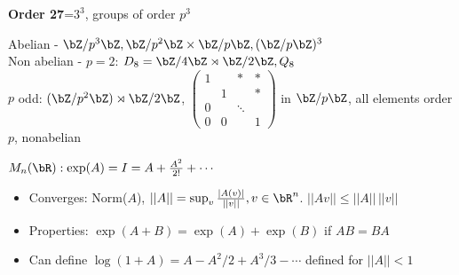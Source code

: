 \noindent
\textbf{Order 27}=$3^3$, groups of order $p^3$ 

\begin{example}
    Abelian - $\bZ/p^3\bZ, \bZ/p^2\bZ \times \bZ/p\bZ, (\bZ/p\bZ)^3$ \\
    Non abelian - $p=2$: $D_8 = \bZ/4\bZ \rtimes \bZ/2\bZ, Q_8$ \\
    $p$ odd: $(\bZ/p^2\bZ) \rtimes \bZ/2\bZ$, $\begin{pmatrix} 1 & & * & * \\ & 1 & & * \\ 0 & & \ddots & \\ 0 & 0 & & 1 \end{pmatrix}$ in $\bZ/p\bZ$, all elements order $p$, nonabelian 
\end{example}

\noindent
$M_n(\bR): \exp(A) = I = A + \frac{A^2}{2!} + \cdots$ \\
\begin{itemize}
    \item Converges: Norm($A$), $||A|| = \sup_{v} \frac{|A(v)|}{||v||}, v \in \bR^n$. $||Av|| \le ||A|| \, ||v||$ 
    \item Properties: $\exp(A+B) = \exp(A)+ \exp(B)$ if $AB = BA$ 
    \item Can define $\log(1+A) = A - A^2/2 + A^3/3 - \cdots$ defined for $||A|| < 1$ 
\end{itemize}

